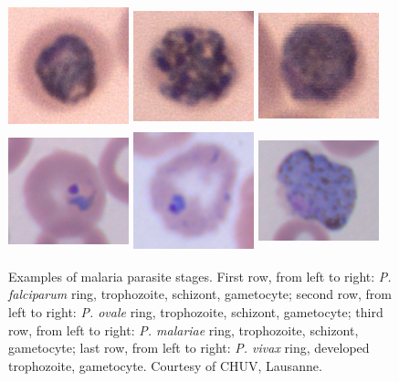 \documentclass[final,a4paper,12pt,english]{UnicaPhdThesis3}
\begin{document}
{\begin{figure}[H]
	\includegraphics[width=3.5cm, height=3.5cm]{images/malaria/malariae_2_trophozoite}
	\includegraphics[width=3.5cm, height=3.5cm]{images/malaria/malariae_3_schizont}
	\includegraphics[width=3.5cm, height=3.5cm]{images/malaria/malariae_4_gametocyte}
	\includegraphics[width=3.5cm, height=3.5cm]{images/malaria/vivax_1_ring}
	\includegraphics[width=3.5cm, height=3.5cm]{images/malaria/vivax_2c_trophozoiteDeveloped}
	\includegraphics[width=3.5cm, height=3.5cm]{images/malaria/vivax_4_gametocyte}
	\caption{\label{fig:malaria_stages}Examples of malaria parasite stages.
		First row, from left to right: \emph{P. falciparum} ring, trophozoite, schizont, gametocyte;
		second row, from left to right: \emph{P. ovale} ring, trophozoite, schizont, gametocyte;
		third row, from left to right: \emph{P. malariae} ring, trophozoite, schizont, gametocyte;
		last row, from left to right: \emph{P. vivax} ring, developed trophozoite, gametocyte.
		Courtesy of CHUV, Lausanne.}
\end{figure}

}
\end{document}
